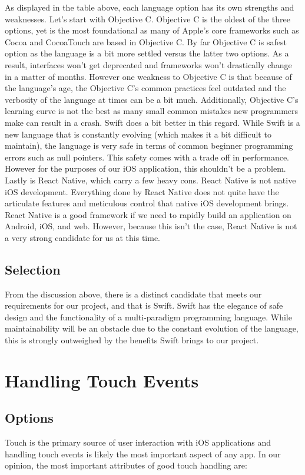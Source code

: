 \documentclass[letterpaper,10pt,titlepage]{article}
\begin{document}
As displayed in the table above, each language option has its own strengths and weaknesses. Let's start with Objective C. Objective C is the oldest of the three options, yet is the most foundational as many of Apple's core frameworks such as Cocoa and CocoaTouch are based in Objective C. By far Objective C is safest option as the language is a bit more settled versus the latter two options. As a result, interfaces won't get deprecated and frameworks won't drastically change in a matter of months. However one weakness to Objective C is that because of the language's age, the Objective C's common practices feel outdated and the verbosity of the language at times can be a bit much. Additionally, Objective C's learning curve is not the best as many small common mistakes new programmers make can result in a crash. Swift does a bit better in this regard. While Swift is a new language that is constantly evolving (which makes it a bit difficult to maintain), the language is very safe in terms of common beginner programming errors such as null pointers. This safety comes with a trade off in performance. However for the purposes of our iOS application, this shouldn't be a problem. Lastly is React Native, which carry a few heavy cons. React Native is not native iOS development. Everything done by React Native does not quite have the articulate features and meticulous control that native iOS development brings. React Native is a good framework if we need to rapidly build an application on Android, iOS, and web. However, because this isn't the case, React Native is not a very strong candidate for us at this time.

\subsection{Selection}

From the discussion above, there is a distinct candidate that meets our requirements for our project, and that is Swift. Swift has the elegance of safe design and the functionality of a multi-paradigm programming language. While maintainability will be an obstacle due to the constant evolution of the language, this is strongly outweighed by the benefits Swift brings to our project.

\section{Handling Touch Events}

\subsection{Options}
Touch is the primary source of user interaction with iOS applications and handling touch events is likely the most important aspect of any app. In our opinion, the most important attributes of good touch handling are:
\end{document}
